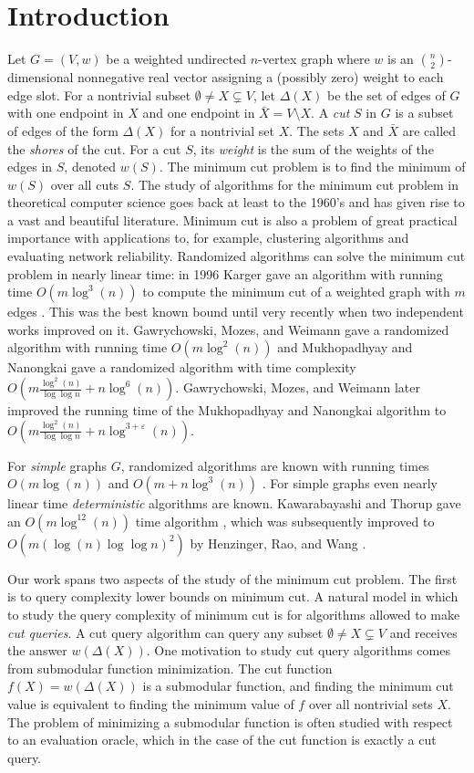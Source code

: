 \section{Introduction}
Let $G = (V,w)$ be a weighted undirected $n$-vertex graph where $w$ is an $\binom{n}{2}$-dimensional nonnegative real vector assigning a (possibly zero) weight to each edge slot.  For a
nontrivial subset $\emptyset \ne X \subsetneq V$, let $\Delta(X)$ be the set of edges of $G$ with one endpoint in $X$ and one endpoint in $\bar{X} = V \setminus X$.  A \emph{cut} $S$ in $G$ is a subset of edges of the form $\Delta(X)$ for
a nontrivial set $X$.  The sets $X$ and $\bar{X}$ are called the \emph{shores} of the cut.  For a cut $S$, its \emph{weight} is the sum of the weights of the edges in $S$, denoted $w(S)$.
The minimum cut problem is to find the minimum of $w(S)$ over all cuts $S$.  The study of algorithms for the minimum cut
problem in theoretical computer science goes back at least to the 1960's and has given rise to a vast and beautiful literature.
Minimum cut is also a problem of great practical importance with applications
to, for example, clustering algorithms and evaluating network reliability. Randomized algorithms can solve the minimum cut problem in nearly linear time: in 1996 Karger gave an
algorithm with running time $O(m \log^3(n))$ to compute the minimum cut of a weighted graph with $m$ edges \cite{Karger00}.  This was the best known bound until very recently when two independent
works improved on it.  Gawrychowski, Mozes, and Weimann \cite{GMW20} gave a randomized algorithm with running time $O(m\log^2(n))$ \cite{GMW20} and Mukhopadhyay and Nanongkai \cite{MN20} gave a randomized algorithm with time complexity $O(m\frac{\log^2(n)}{\log\log n}+n\log^6(n))$.   Gawrychowski, Mozes, and Weimann \cite{GMW20b} later improved the running time of the Mukhopadhyay and Nanongkai algorithm to $O(m\frac{\log^2(n)}{\log\log n}+n\log^{3+\varepsilon}(n))$.

For \emph{simple} graphs $G$, randomized algorithms are known with running times $O(m \log(n))$ and $O(m + n \log^3(n))$ \cite{GNT20}.  For simple graphs even nearly linear
time \emph{deterministic} algorithms are known.  Kawarabayashi and Thorup gave an $O(m \log^{12}(n))$ time algorithm \cite{KT19}, which was subsequently improved to
$O(m (\log(n) \log \log n)^2)$ by Henzinger, Rao, and Wang \cite{HRW20}.


Our work spans two aspects of the study of the minimum cut problem.  The first is to query complexity lower bounds on minimum cut.
A natural model in which to study the query
complexity of minimum cut is for algorithms allowed to make \emph{cut queries}.  A cut query algorithm can query any subset $\emptyset \ne X \subsetneq V$ and receives the
answer $w(\Delta(X))$.  One motivation to study cut query algorithms comes from submodular function minimization.  The cut function $f(X) = w(\Delta(X))$ is a submodular
function, and finding the minimum cut value is equivalent to finding the minimum value of $f$ over all nontrivial sets $X$.  The problem of minimizing a submodular function is often studied with respect to an evaluation
oracle, which in the case of the cut function is exactly a cut query.

